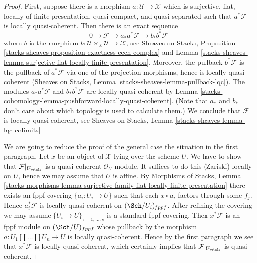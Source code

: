 \begin{proof}
First, suppose there is a morphism $a : \mathcal{U} \to \mathcal{X}$
which is surjective, flat, locally of finite presentation, quasi-compact,
and quasi-separated such that $a^*\mathcal{F}$ is locally quasi-coherent.
Then there is an exact sequence
$$
0 \to \mathcal{F} \to a_*a^*\mathcal{F} \to b_*b^*\mathcal{F}
$$
where $b$ is the morphism
$b : \mathcal{U} \times_\mathcal{X} \mathcal{U} \to \mathcal{X}$, see
Sheaves on Stacks, Proposition
\ref{stacks-sheaves-proposition-exactness-cech-complex} and
Lemma \ref{stacks-sheaves-lemma-surjective-flat-locally-finite-presentation}.
Moreover, the pullback $b^*\mathcal{F}$ is the pullback of $a^*\mathcal{F}$
via one of the projection morphisms, hence is locally quasi-coherent
(Sheaves on Stacks, Lemma \ref{stacks-sheaves-lemma-pullback-lqc}).
The modules $a_*a^*\mathcal{F}$ and $b_*b^*\mathcal{F}$ are locally
quasi-coherent by Lemma \ref{stacks-cohomology-lemma-pushforward-locally-quasi-coherent}.
(Note that $a_*$ and $b_*$ don't care about which topology is
used to calculate them.)
We conclude that $\mathcal{F}$ is locally quasi-coherent, see
Sheaves on Stacks, Lemma \ref{stacks-sheaves-lemma-lqc-colimits}.

\medskip\noindent
We are going to reduce the proof of the general case the
situation in the first paragraph. Let $x$ be an object of $\mathcal{X}$
lying over the scheme $U$. We have to show that
$\mathcal{F}|_{U_\etale}$ is a quasi-coherent $\mathcal{O}_U$-module.
It suffices to do this (Zariski) locally on $U$, hence we may
assume that $U$ is affine. By
Morphisms of Stacks, Lemma
\ref{stacks-morphisms-lemma-surjective-family-flat-locally-finite-presentation}
there exists an fppf covering $\{a_i : U_i \to U\}$ such that
each $x \circ a_i$ factors through some $f_j$. Hence $a_i^*\mathcal{F}$
is locally quasi-coherent on $(\Sch/U_i)_{fppf}$. After refining
the covering we may assume $\{U_i \to U\}_{i = 1, \ldots, n}$
is a standard fppf covering. Then $x^*\mathcal{F}$ is an fppf
module on $(\Sch/U)_{fppf}$ whose pullback by the morphism
$a : U_1 \amalg \ldots \amalg U_n \to U$ is locally quasi-coherent.
Hence by the first paragraph we see that $x^*\mathcal{F}$ is locally
quasi-coherent, which certainly implies that $\mathcal{F}|_{U_\etale}$
is quasi-coherent.
\end{proof}

